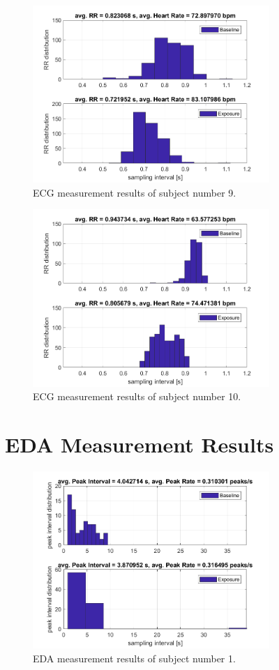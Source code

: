 \begin{figure}[H]
\centering
\includegraphics[width=0.8\textwidth]{images/9ECG.png}
\caption{ECG measurement results of subject number 9.}
\label{EDAtabImg}
\end{figure}

\begin{figure}[H]
\centering
\includegraphics[width=0.8\textwidth]{images/10ECG.png}
\caption{ECG measurement results of subject number 10.}
\label{EDAtabImg}
\end{figure}

\section{EDA Measurement Results}

\begin{figure}[H]
\centering
\includegraphics[width=0.8\textwidth]{images/1EDA.png}
\caption{EDA measurement results of subject number 1.}
\label{EDAtabImg}
\end{figure}

